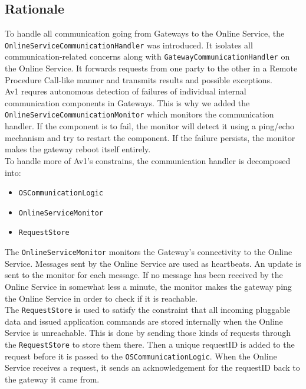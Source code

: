     \subsection*{Rationale}
        To handle all communication going from Gateways to the Online Service, the \texttt{OnlineServiceCommunicationHandler}
        was introduced. It isolates all communication-related concerns along with \texttt{GatewayCommunicationHandler} on
        the Online Service. It forwards requests from one party to the other in a Remote Procedure Call-like manner and transmits results and
        possible exceptions. \\
        Av1 requres autonomous detection of failures of individual internal communication components in Gateways. This is why we added the
        \texttt{OnlineServiceCommunicationMonitor} which monitors the communication handler. If the component is to fail, the monitor will
        detect it using a ping/echo mechanism and try to restart the component. If the failure persists, the monitor makes the gateway
        reboot itself entirely. \\
        To handle more of Av1's constrains, the communication handler is decomposed into:
        \begin{itemize}
            \item \texttt{OSCommunicationLogic}
            \item \texttt{OnlineServiceMonitor}
            \item \texttt{RequestStore}
        \end{itemize}
        The \texttt{OnlineServiceMonitor} monitors the Gateway's connectivity to the Online Service. Messages sent by the Online Service
        are used as heartbeats. An update is sent to the monitor for each message. If no message has been received by the Online Service
        in somewhat less a minute, the monitor makes the gateway ping the Online Service in order to check if it is reachable. \\
        The \texttt{RequestStore} is used to satisfy the constraint that all incoming pluggable data and issued application commands
        are stored internally when the Online Service is unreachable. This is done by sending those kinds of requests through the \texttt{RequestStore}
        to store them there. Then a unique requestID is added to the request before it is passed to the \texttt{OSCommunicationLogic}.
        When the Online Service receives a request, it sends an acknowledgement for the requestID back to the gateway it came from.
